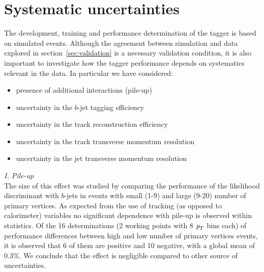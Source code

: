 \section{Systematic uncertainties}\label{sec:gbbSystematics}

The development, training and performance determination of the tagger is based on simulated events. Although the agreement between simulation and data explored in section~\ref{sec:validation} is a necessary validation condition, it is also important to investigate how the tagger performance depends on systematics relevant in the data. In particular we have considered:
%
%
\begin{itemize}\addtolength{\itemsep}{-0.4\baselineskip}
\item
presence of additional interactions (pile-up)
\item
uncertainty in the $b$-jet tagging efficiency %
\item
uncertainty in the track reconstruction efficiency
\item
uncertainty in the track transverse momentum resolution
\item
uncertainty in the jet transverse momentum resolution  
\end{itemize}

{ \em I. Pile-up}
\\[3mm]
  The size of this effect was studied by comparing the performance of the likelihood discriminant with $b$-jets in events with small (1-9) and large (9-20) number of primary vertices. 
As expected from the use of tracking (as opposed to calorimeter) variables no significant dependence with pile-up is observed within statistics. Of the 16 determinations (2 working points with 8 ${\emph{p}_{T}}$ bins each) of performance differences between high and low number of primary vertices events, it is observed that 6 of them are positive and 10 negative, with a global mean of 0.3\%. We conclude that the effect is negligible compared to other source of uncertainties.
%

